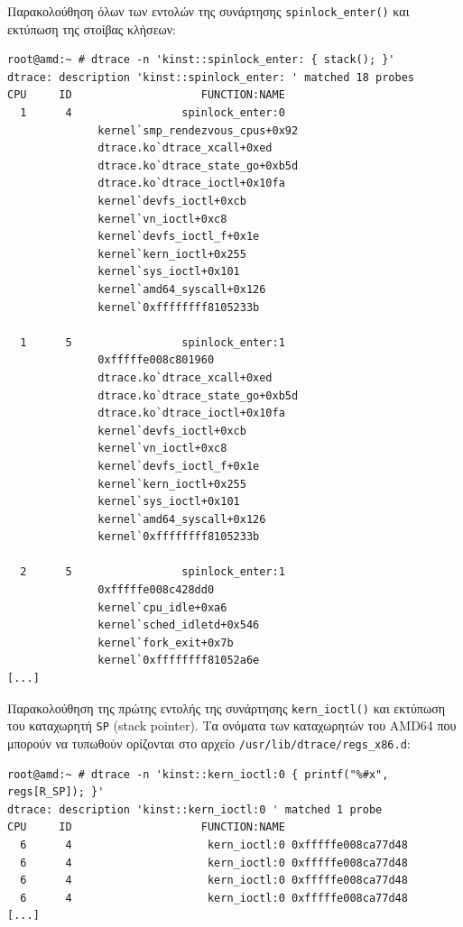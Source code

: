 \documentclass[12pt]{article}
\begin{document}
Παρακολούθηση όλων των εντολών της συνάρτησης \lstinline{spinlock_enter()} και
εκτύπωση της στοίβας κλήσεων:

\begin{lstlisting}
root@amd:~ # dtrace -n 'kinst::spinlock_enter: { stack(); }'
dtrace: description 'kinst::spinlock_enter: ' matched 18 probes
CPU     ID                    FUNCTION:NAME
  1      4                 spinlock_enter:0
              kernel`smp_rendezvous_cpus+0x92
              dtrace.ko`dtrace_xcall+0xed
              dtrace.ko`dtrace_state_go+0xb5d
              dtrace.ko`dtrace_ioctl+0x10fa
              kernel`devfs_ioctl+0xcb
              kernel`vn_ioctl+0xc8
              kernel`devfs_ioctl_f+0x1e
              kernel`kern_ioctl+0x255
              kernel`sys_ioctl+0x101
              kernel`amd64_syscall+0x126
              kernel`0xffffffff8105233b

  1      5                 spinlock_enter:1
              0xfffffe008c801960
              dtrace.ko`dtrace_xcall+0xed
              dtrace.ko`dtrace_state_go+0xb5d
              dtrace.ko`dtrace_ioctl+0x10fa
              kernel`devfs_ioctl+0xcb
              kernel`vn_ioctl+0xc8
              kernel`devfs_ioctl_f+0x1e
              kernel`kern_ioctl+0x255
              kernel`sys_ioctl+0x101
              kernel`amd64_syscall+0x126
              kernel`0xffffffff8105233b
	      
  2      5                 spinlock_enter:1
              0xfffffe008c428dd0
              kernel`cpu_idle+0xa6
              kernel`sched_idletd+0x546
              kernel`fork_exit+0x7b
              kernel`0xffffffff81052a6e
[...]
\end{lstlisting}

Παρακολούθηση της πρώτης εντολής της συνάρτησης \lstinline{kern_ioctl()} και
εκτύπωση του καταχωρητή \lstinline{SP} (stack pointer). Τα ονόματα των
καταχωρητών του AMD64 που μπορούν να τυπωθούν ορίζονται στο αρχείο
\lstinline{/usr/lib/dtrace/regs_x86.d}:

\begin{lstlisting}
root@amd:~ # dtrace -n 'kinst::kern_ioctl:0 { printf("%#x", regs[R_SP]); }'
dtrace: description 'kinst::kern_ioctl:0 ' matched 1 probe
CPU     ID                    FUNCTION:NAME
  6      4                     kern_ioctl:0 0xfffffe008ca77d48
  6      4                     kern_ioctl:0 0xfffffe008ca77d48
  6      4                     kern_ioctl:0 0xfffffe008ca77d48
  6      4                     kern_ioctl:0 0xfffffe008ca77d48
[...]
\end{lstlisting}
\end{document}
